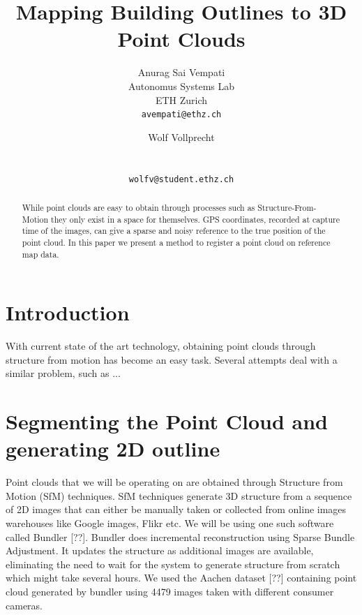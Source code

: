 \documentclass[10pt,twocolumn,letterpaper]{article}
\begin{document}
\title{Mapping Building Outlines to 3D Point Clouds}

\author{Anurag Sai Vempati\\
Autonomus Systems Lab\\ ETH Zurich\\
{\tt\small avempati@ethz.ch}
\and
Wolf Vollprecht\\
\\
\\
{\tt\small wolfv@student.ethz.ch}
}

\maketitle

\begin{abstract}
  While point clouds are easy to obtain through processes such as Structure-From-Motion they only exist in a space for themselves. GPS coordinates, recorded at capture time of the images, can give a sparse and noisy reference to the true position of the point cloud. In this paper we present a method to register a point cloud on reference map data.
\end{abstract}

\section{Introduction}

With current state of  the art technology, obtaining point clouds through structure from motion has become an easy task. 
Several attempts deal with a similar problem, such as ... 

\section{Segmenting the Point Cloud and generating 2D outline}

Point clouds that we will be operating on are obtained through Structure from Motion (SfM) techniques. SfM techniques generate 3D structure from a sequence of 2D images that can either be manually taken or collected from online images warehouses like Google images, Flikr etc. We will be using one such software called Bundler [??]. Bundler does incremental reconstruction using Sparse Bundle Adjustment. It updates the structure as additional images are available, eliminating the need to wait for the system to generate structure from scratch which might take several hours. We used the Aachen dataset [??] containing point cloud generated by bundler using 4479 images taken with different consumer cameras.
\end{document}
